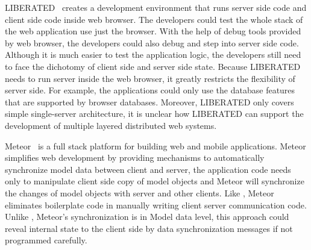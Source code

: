 LIBERATED~\cite{lipman2011liberated} creates a development environment that runs server side code and 
client side code inside web browser.
The developers could test the whole stack of the web application use just the browser.
With the help of \js{} debug tools provided by web browser, the developers could also
debug and step into server side code.
Although it is much easier to test the application logic,
the developers still need to face the dichotomy of client side and server side state.
Because LIBERATED needs to run server inside the web browser,
it greatly restricts the flexibility of server side.
For example, the applications could only use the database features that are supported by
browser databases.
Moreover, LIBERATED only covers simple single-server architecture, 
it is unclear how LIBERATED can support the development of multiple layered distributed web systems.

Meteor~\cite{meteor} is a full stack platform for building web and mobile applications.
Meteor simplifies web development by providing mechanisms to automatically synchronize model data 
between client and server,
the application code needs only to manipulate client side copy of model objects and
Meteor will synchronize the changes of model objects with server and other clients.
Like \cb{}, Meteor eliminates boilerplate code in manually writing client server communication code.
Unlike \cb{}, Meteor's synchronization is in Model data level, this approach
could reveal internal state to the client side by data synchronization messages if not programmed carefully.
